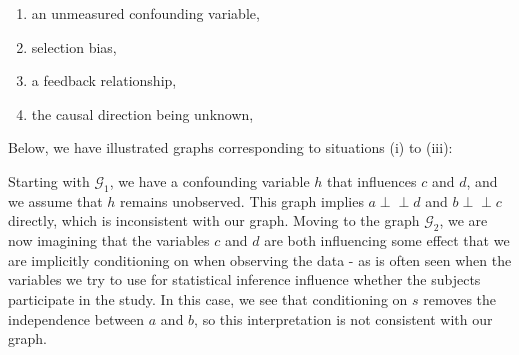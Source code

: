 \documentclass[11pt, a4paper]{memoir}
\theoremstyle{break}
\theoremstyle{break}
\theoremstyle{nonumberplain}
\newcommand{\indep}{\perp \!\!\! \perp}
\begin{document}
\begin{enumerate}[label=(\roman*)]
	\item an unmeasured confounding variable,
	\item selection bias,
	\item a feedback relationship,
	\item the causal direction being unknown,
\end{enumerate}
Below, we have illustrated graphs corresponding to situations (i) to (iii):
\begin{center}
\end{center}
Starting with $\mathcal{G}_1$, we have a confounding variable $h$ that influences $c$ and $d$, and we assume that $h$ remains unobserved. This graph implies $a\indep d$ and $b\indep c$ directly, which is inconsistent with our graph. Moving to the graph $\mathcal{G}_2$, we are now imagining that the variables $c$ and $d$ are both influencing some effect that we are implicitly conditioning on when observing the data - as is often seen when the variables we try to use for statistical inference influence whether the subjects participate in the study. In this case, we see that conditioning on $s$ removes the independence between $a$ and $b$, so this interpretation is not consistent with our graph.\\\\
\end{document}
